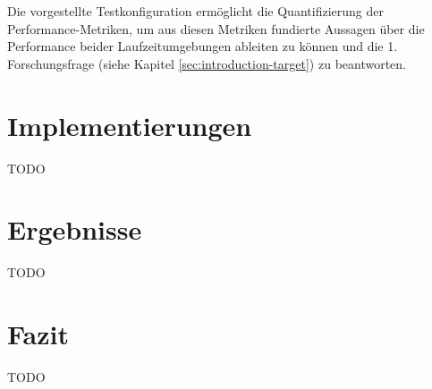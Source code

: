 \noindent
Die vorgestellte Testkonfiguration ermöglicht die Quantifizierung der Performance-Metriken, um aus diesen Metriken fundierte Aussagen über die Performance beider Laufzeitumgebungen ableiten zu können und die 1. Forschungsfrage (siehe Kapitel \ref{sec:introduction-target}) zu beantworten.


\section{Implementierungen} \label{sec:performance-implementations}
TODO 
\\

\section{Ergebnisse} \label{sec:performance-results}
TODO \\

\section{Fazit} \label{sec:performance-conclusion}
TODO \\